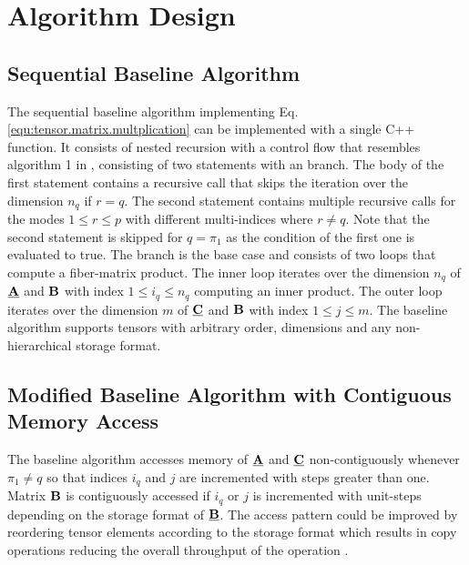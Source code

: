 \section{Algorithm Design}
\label{sec:design}
\subsection{Sequential Baseline Algorithm}
The sequential baseline algorithm implementing Eq. \ref{equ:tensor.matrix.multplication} can be implemented with a single C++ function.
It consists of nested recursion with a control flow that resembles algorithm 1 in \cite{bassoy:2018:fast}, consisting of two  statements with an  branch.
The body of the first  statement contains a recursive call that skips the iteration over the dimension $n_q$ if $r = q$.
The second  statement contains multiple recursive calls for the modes $1 \leq r \leq p$ with different multi-indices where $r\neq q$.
Note that the second  statement is skipped for $q = \pi_1$ as the condition of the first one is evaluated to true.
The  branch is the base case and consists of two loops that compute a fiber-matrix product.
The inner loop iterates over the dimension $n_q$ of $\underline{\mathbf{A}}$ and $\mathbf{B}$ with index $1\leq i_q \leq n_q$ computing an inner product.
The outer loop iterates over the dimension $m$ of $\underline{\mathbf{C}}$ and $\mathbf{B}$ with index $1 \leq j \leq m$.
The baseline algorithm supports tensors with arbitrary order, dimensions and any non-hierarchical storage format.

\subsection{Modified Baseline Algorithm with Contiguous Memory Access}
The baseline algorithm accesses memory of $\underline{\mathbf{A}}$ and $\underline{\mathbf{C}}$ non-contiguously whenever $\pi_1 \neq q$ so that indices $i_q$ and $j$ are incremented with steps greater than one.
Matrix $\mathbf{B}$ is contiguously accessed if $i_q$ or $j$ is incremented with unit-steps depending on the storage format of $\underline{\mathbf{B}}$.
The access pattern could be improved by reordering tensor elements according to the storage format which results in copy operations reducing the overall throughput of the operation \cite{shi:2016:tensor.contraction}.

